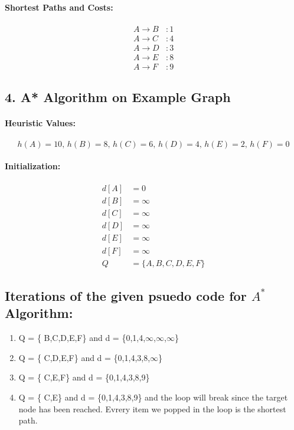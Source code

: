 \documentclass{article}
\begin{document}
\paragraph{Shortest Paths and Costs:}
\[
\begin{aligned}
    A \to B &: 1 \\
    A \to C &: 4 \\
    A \to D &: 3 \\
    A \to E &: 8 \\
    A \to F &: 9
\end{aligned}
\]

\subsection*{4. A* Algorithm on Example Graph}
\paragraph{Heuristic Values:}
\[
h(A) = 10, \, h(B) = 8, \, h(C) = 6, \, h(D) = 4, \, h(E) = 2, \, h(F) = 0
\]

\paragraph{Initialization:}
\[
\begin{aligned}
    d[A] &= 0 \\
    d[B] &= \infty \\
    d[C] &= \infty \\
    d[D] &= \infty \\
    d[E] &= \infty \\
    d[F] &= \infty \\
    Q &= \{A,B,C,D,E,F\}
\end{aligned}
\]
\subsection*{Iterations of the given psuedo code for $A^*$ Algorithm: }
\begin{enumerate}
    \item Q = \{ B,C,D,E,F\} and d = \{0,1,4,$\infty$,$\infty$,$\infty$\}
    \item Q = \{ C,D,E,F\} and d = \{0,1,4,3,8,$\infty$\}
    \item Q = \{ C,E,F\} and d = \{0,1,4,3,8,9\}
    \item Q = \{ C,E\} and d = \{0,1,4,3,8,9\} and the loop will break since the target node has been reached. Evrery item we popped in the loop is the shortest path.
\end{enumerate}
\end{document}
